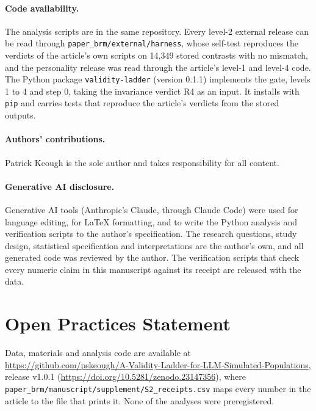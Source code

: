 \paragraph{Code availability.} The analysis scripts are in the same repository. Every level-2 external release can be read through \texttt{paper\_brm/external/harness}, whose self-test reproduces the verdicts of the article's own scripts on 14,349 stored contrasts with no mismatch, and the personality release was read through the article's level-1 and level-4 code. The Python package \texttt{validity-ladder} (version 0.1.1) implements the gate, levels 1 to 4 and step 0, taking the invariance verdict R4 as an input. It installs with \texttt{pip} and carries tests that reproduce the article's verdicts from the stored outputs.

\paragraph{Authors' contributions.} Patrick Keough is the sole author and takes responsibility for all content.

\paragraph{Generative AI disclosure.} Generative AI tools (Anthropic's Claude, through Claude Code) were used for language editing, for LaTeX formatting, and to write the Python analysis and verification scripts to the author's specification. The research questions, study design, statistical specification and interpretations are the author's own, and all generated code was reviewed by the author. The verification scripts that check every numeric claim in this manuscript against its receipt are released with the data.

\section*{Open Practices Statement}

Data, materials and analysis code are available at \url{https://github.com/pskeough/A-Validity-Ladder-for-LLM-Simulated-Populations}, release v1.0.1 (\url{https://doi.org/10.5281/zenodo.23147356}), where \texttt{paper\_brm/manuscript/supplement/S2\_receipts.csv} maps every number in the article to the file that prints it. None of the analyses were preregistered.
